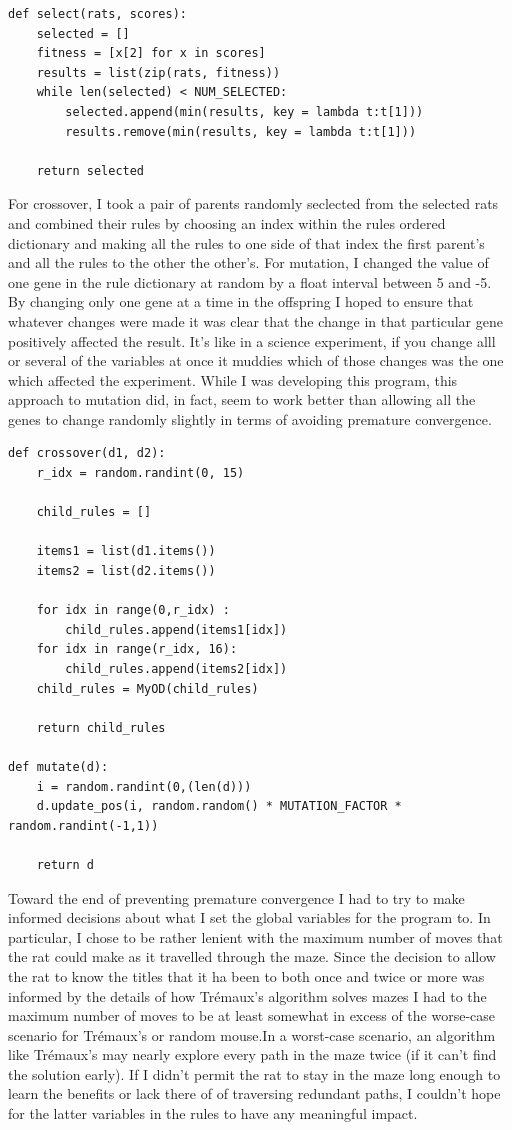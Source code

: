 \documentclass[12pt]{article}
\begin{document}
\begin{verbatim}
def select(rats, scores):
    selected = []
    fitness = [x[2] for x in scores]
    results = list(zip(rats, fitness))
    while len(selected) < NUM_SELECTED:
        selected.append(min(results, key = lambda t:t[1]))
        results.remove(min(results, key = lambda t:t[1]))

    return selected
\end{verbatim}

For crossover, I took a pair of parents randomly seclected from the selected rats and combined their rules by choosing an index within the rules ordered dictionary and making all the rules to one side of that index the first parent's and all the rules to the other the other's. For mutation, I changed the value of one gene in the rule dictionary at random by a float interval between 5 and -5. By changing only one gene at a time in the offspring I hoped to ensure that whatever changes were made it was clear that the change in that particular gene positively affected the result. It's like in a science experiment, if you change alll or several of the variables at once it muddies which of those changes was the one which affected the experiment. While I was developing this program, this approach to mutation did, in fact, seem to work better than allowing all the genes to change randomly slightly in terms of avoiding premature convergence.

\begin{verbatim}
def crossover(d1, d2):
    r_idx = random.randint(0, 15)

    child_rules = []

    items1 = list(d1.items())
    items2 = list(d2.items())

    for idx in range(0,r_idx) :
        child_rules.append(items1[idx])
    for idx in range(r_idx, 16):
        child_rules.append(items2[idx])
    child_rules = MyOD(child_rules)

    return child_rules

def mutate(d):
    i = random.randint(0,(len(d)))
    d.update_pos(i, random.random() * MUTATION_FACTOR * random.randint(-1,1))

    return d
\end{verbatim}

Toward the end of preventing premature convergence I had to try to make informed decisions about what I set the global variables for the program to. In particular, I chose to be rather lenient with the maximum number of moves that the rat could make as it travelled through the maze. Since the decision to allow the rat to know the titles that it ha been to both once and twice or more was informed by the details of how  Tr\'{e}maux's algorithm solves mazes I had to the maximum number of moves to be at least somewhat in excess of the worse-case scenario for  Tr\'{e}maux's or random mouse.In a worst-case scenario, an algorithm like  Tr\'{e}maux's may nearly explore every path in the maze twice (if it can't find the solution early). If I didn't permit the rat to stay in the maze long enough to learn the benefits or lack there of of traversing redundant paths, I couldn't hope for the latter variables in the rules to have any meaningful impact.
\end{document}
